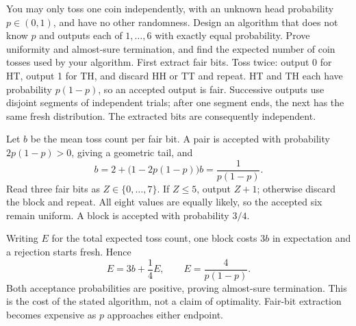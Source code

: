 You may only toss one coin independently, with an unknown head probability $p\in(0,1)$, and have no other randomness. Design an algorithm that does not know $p$ and outputs each of $1,\ldots,6$ with exactly equal probability. Prove uniformity and almost-sure termination, and find the expected number of coin tosses used by your algorithm.
\solution First extract fair bits. Toss twice: output 0 for HT, output 1 for TH, and discard HH or TT and repeat. HT and TH each have probability $p(1-p)$, so an accepted output is fair. Successive outputs use disjoint segments of independent trials; after one segment ends, the next has the same fresh distribution. The extracted bits are consequently independent.

Let $b$ be the mean toss count per fair bit. A pair is accepted with probability $2p(1-p)>0$, giving a geometric tail, and
\[
b=2+\bigl(1-2p(1-p)\bigr)b
  =\frac1{p(1-p)}.
\]
Read three fair bits as $Z\in\{0,\ldots,7\}$. If $Z\le5$, output $Z+1$; otherwise discard the block and repeat. All eight values are equally likely, so the accepted six remain uniform. A block is accepted with probability $3/4$.

Writing $E$ for the total expected toss count, one block costs $3b$ in expectation and a rejection starts fresh. Hence
\[
E=3b+\frac14E,\qquad
\boxed{E=\frac4{p(1-p)}}.
\]
Both acceptance probabilities are positive, proving almost-sure termination. This is the cost of the stated algorithm, not a claim of optimality. Fair-bit extraction becomes expensive as $p$ approaches either endpoint.
